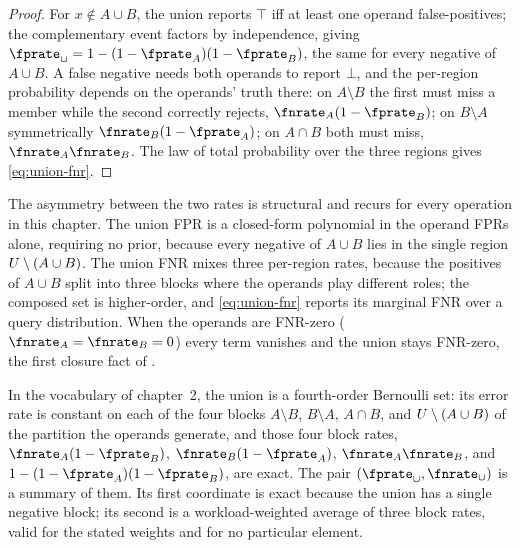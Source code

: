 \begin{proof}
For $x \notin A \cup B$, the union reports $\top$ iff at least one operand
false-positives; the complementary event factors by independence, giving
$\fprate_\cup = 1 - (1 - \fprate_A)(1 - \fprate_B)$, the same for every
negative of $A \cup B$. A false negative needs both operands to report
$\bot$, and the per-region probability depends on the operands' truth
there: on $A \setminus B$ the first must miss a member while the second
correctly rejects, $\fnrate_A(1 - \fprate_B)$; on $B \setminus A$
symmetrically $\fnrate_B(1 - \fprate_A)$; on $A \cap B$ both must miss,
$\fnrate_A \fnrate_B$. The law of total probability over the three regions
gives \eqref{eq:union-fnr}.
\end{proof}

The asymmetry between the two rates is structural and recurs for every
operation in this chapter. The union FPR is a closed-form polynomial in the
operand FPRs alone, requiring no prior, because every negative of $A \cup B$
lies in the single region $U \setminus (A \cup B)$. The union FNR
mixes three per-region rates, because the positives of $A \cup B$ split into
three blocks where the operands play different roles; the composed set is
higher-order, and \eqref{eq:union-fnr} reports its marginal FNR over a
query distribution. When the operands are FNR-zero ($\fnrate_A = \fnrate_B =
0$) every term vanishes and the union stays FNR-zero, the first closure fact
of .

In the vocabulary of chapter~2, the union is a fourth-order Bernoulli
set: its error rate is constant
on each of the four blocks $A \setminus B$, $B \setminus A$, $A \cap B$, and
$U \setminus (A \cup B)$ of the partition the operands generate, and
those four block rates, $\fnrate_A(1 - \fprate_B)$, $\fnrate_B(1 -
\fprate_A)$, $\fnrate_A\fnrate_B$, and $1 - (1 - \fprate_A)(1 - \fprate_B)$,
are exact. The pair $(\fprate_\cup, \fnrate_\cup)$ is a summary of them. Its
first coordinate is exact because the union has a single negative block; its
second is a workload-weighted average of three
block rates, valid for the stated weights and for no particular element.

